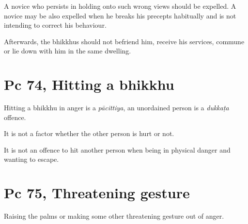 A novice who persists in holding onto such wrong views should be
expelled. A novice may be also expelled when he breaks his precepts
habitually and is not intending to correct his behaviour.

Afterwards, the bhikkhus should not befriend him, receive his services,
commune or lie down with him in the same dwelling.

\section{Pc 74, Hitting a bhikkhu}

Hitting a bhikkhu in anger is a \emph{pācittiya}, an unordained person
is a \emph{dukkaṭa} offence.

It is not a factor whether the other person is hurt or not.

It is not an offence to hit another person when being in physical danger
and wanting to escape.

\section{Pc 75, Threatening gesture}

Raising the palms or making some other threatening gesture out of anger.

